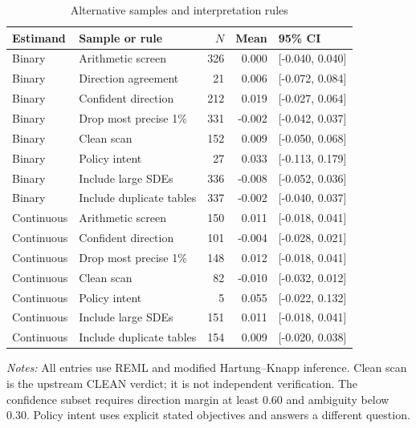 \begin{table}[htbp]\centering\small
\caption{Alternative samples and interpretation rules}\label{tab:robustness}
\setlength{\tabcolsep}{4pt}
\begin{tabular}{llrrl}\toprule
Estimand & Sample or rule & $N$ & Mean & 95\% CI \\
\midrule
Binary & Arithmetic screen & 326 & 0.000 & [-0.040, 0.040] \\
Binary & Direction agreement & 21 & 0.006 & [-0.072, 0.084] \\
Binary & Confident direction & 212 & 0.019 & [-0.027, 0.064] \\
Binary & Drop most precise 1\% & 331 & -0.002 & [-0.042, 0.037] \\
Binary & Clean scan & 152 & 0.009 & [-0.050, 0.068] \\
Binary & Policy intent & 27 & 0.033 & [-0.113, 0.179] \\
Binary & Include large SDEs & 336 & -0.008 & [-0.052, 0.036] \\
Binary & Include duplicate tables & 337 & -0.002 & [-0.040, 0.037] \\
Continuous & Arithmetic screen & 150 & 0.011 & [-0.018, 0.041] \\
Continuous & Confident direction & 101 & -0.004 & [-0.028, 0.021] \\
Continuous & Drop most precise 1\% & 148 & 0.012 & [-0.018, 0.041] \\
Continuous & Clean scan & 82 & -0.010 & [-0.032, 0.012] \\
Continuous & Policy intent & 5 & 0.055 & [-0.022, 0.132] \\
Continuous & Include large SDEs & 151 & 0.011 & [-0.018, 0.041] \\
Continuous & Include duplicate tables & 154 & 0.009 & [-0.020, 0.038] \\
\bottomrule\end{tabular}
\par\vspace{4pt}\begin{minipage}{\textwidth}\footnotesize
\textit{Notes:} All entries use REML and modified Hartung--Knapp inference. Clean scan is the upstream CLEAN verdict; it is not independent verification. The confidence subset requires direction margin at least 0.60 and ambiguity below 0.30. Policy intent uses explicit stated objectives and answers a different question.
\end{minipage}
\end{table}
